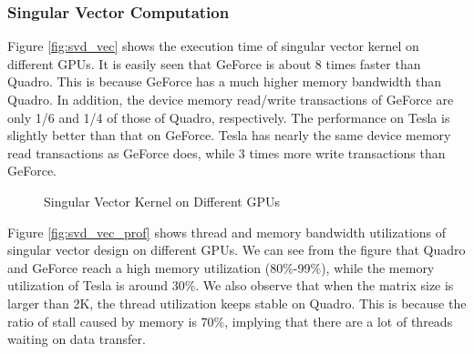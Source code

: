 \vspace{-0.2in}
\subsubsection{Singular Vector Computation}
Figure \ref{fig:svd_vec} shows the execution time of singular vector kernel on different GPUs. 
It is easily seen that GeForce is about 8 times faster than
Quadro. This is because GeForce has a much higher memory bandwidth
than Quadro.
In addition, the device memory read/write transactions of GeForce are only 1/6 and 1/4 of those of Quadro, respectively.
The performance on Tesla is slightly better than that on GeForce.
Tesla has nearly the same device memory read transactions as GeForce does, while 3 times more write transactions than GeForce.

\begin{figure}[hbpt]
\vspace{-0.2in}
\centering
\vspace{-0.1in}
  \caption{Singular Vector Kernel on Different GPUs}
  \label{fig:svdvec}
\vspace{-0.3in}
\end{figure}

Figure \ref{fig:svd_vec_prof} shows thread and memory bandwidth utilizations of singular vector design on different GPUs. 
We can see from the figure that Quadro and GeForce reach a high memory utilization (80\%-99\%), while the memory utilization of Tesla is around 30\%. 
We also observe that when the matrix size is larger than 2K, the thread utilization keeps stable on Quadro. 
This is because the ratio of stall caused by memory is 70\%, implying that there are a lot of threads waiting on data transfer.

\vspace{-0.1in}
